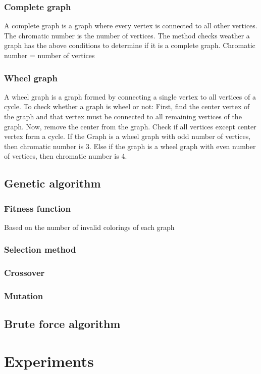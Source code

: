 \documentclass[a4paper]{report}
\begin{document}
			\subsection{Complete graph}
			A complete graph is a graph where every vertex is connected to all other vertices. The chromatic number is the number of vertices. The method checks weather a graph has the above conditions to determine if it is a complete graph.
			Chromatic number = number of vertices
			\subsection{Wheel graph}
			A wheel graph is a graph formed by connecting a single vertex to all vertices of a cycle.
			To check whether a graph is wheel or not: First, find the center vertex of the graph and that vertex must be connected to all remaining vertices of the graph. Now, remove the  center from the graph. Check if all vertices except center vertex form a cycle.
			If the Graph is a wheel graph with odd number of vertices, then chromatic number is 3.
			Else if the graph is a wheel graph with even number of vertices, then chromatic number is 4.
			
			
		\section{Genetic algorithm}
			\subsection{Fitness function}
			Based on the number of invalid colorings of each graph
			\subsection{Selection method}
			\subsection{Crossover}
			\subsection{Mutation}
		
		\section{Brute force algorithm}
		
		
	\chapter{Experiments}
		
\end{document}
